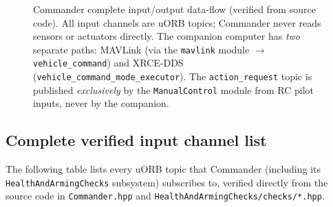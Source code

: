 \documentclass[12pt,a4paper]{article}
\begin{document}
\begin{figure}[h!]
\begin{tikzpicture}
\end{tikzpicture}
\caption{Commander complete input/output data-flow (verified from source code).
All input channels are uORB topics; Commander never reads sensors or actuators
directly.  The companion computer has \emph{two} separate paths: MAVLink (via
the \texttt{mavlink} module $\to$ \texttt{vehicle\_command}) and XRCE-DDS
(\texttt{vehicle\_command\_mode\_executor}).  The \texttt{action\_request}
topic is published \emph{exclusively} by the \texttt{ManualControl} module
from RC pilot inputs, never by the companion.}
\label{fig:commander_flow}
\end{figure}

\subsection*{Complete verified input channel list}

The following table lists every uORB topic that Commander (including its
\texttt{HealthAndArmingChecks} subsystem) subscribes to, verified directly
from the source code in \texttt{Commander.hpp} and
\texttt{HealthAndArmingChecks/checks/*.hpp}.
\end{document}
